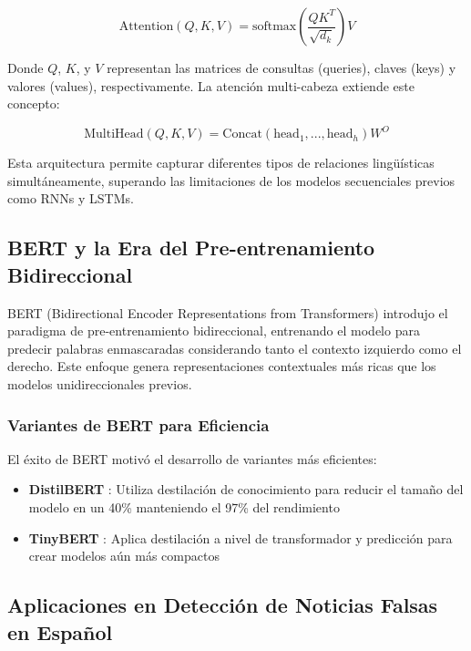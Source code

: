 \begin{equation}
\text{Attention}(Q,K,V) = \text{softmax}\left(\frac{QK^T}{\sqrt{d_k}}\right)V
\end{equation}

Donde $Q$, $K$, y $V$ representan las matrices de consultas (queries), claves (keys) y valores (values), respectivamente. La atención multi-cabeza extiende este concepto:

\begin{equation}
\text{MultiHead}(Q,K,V) = \text{Concat}(\text{head}_1, ..., \text{head}_h)W^O
\end{equation}

Esta arquitectura permite capturar diferentes tipos de relaciones lingüísticas simultáneamente, superando las limitaciones de los modelos secuenciales previos como RNNs y LSTMs.

\subsection{BERT y la Era del Pre-entrenamiento Bidireccional}

BERT (Bidirectional Encoder Representations from Transformers) \cite{devlin2018bert} introdujo el paradigma de pre-entrenamiento bidireccional, entrenando el modelo para predecir palabras enmascaradas considerando tanto el contexto izquierdo como el derecho. Este enfoque genera representaciones contextuales más ricas que los modelos unidireccionales previos.

\subsubsection{Variantes de BERT para Eficiencia}

El éxito de BERT motivó el desarrollo de variantes más eficientes:
\begin{itemize}
    \item \textbf{DistilBERT} \cite{sanh2019distilbert}: Utiliza destilación de conocimiento para reducir el tamaño del modelo en un 40\% manteniendo el 97\% del rendimiento
    \item \textbf{TinyBERT} \cite{jiao2019tinybert}: Aplica destilación a nivel de transformador y predicción para crear modelos aún más compactos
\end{itemize}

\subsection{Aplicaciones en Detección de Noticias Falsas en Español}

